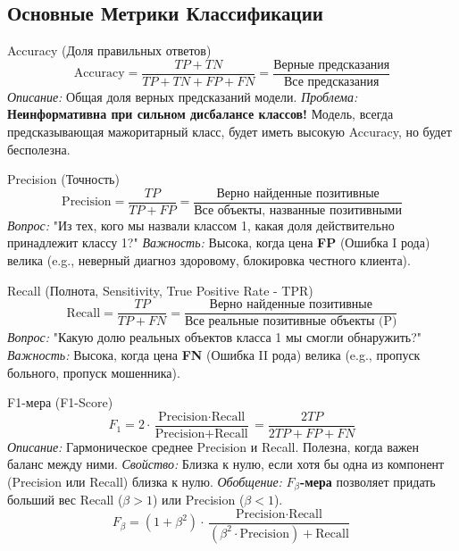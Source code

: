 \subsection{Основные Метрики Классификации}

\begin{textbox}{{Accuracy (Доля правильных ответов)}}
    \[ \text{Accuracy} = \frac{TP + TN}{TP + TN + FP + FN} = \frac{\text{Верные предсказания}}{\text{Все предсказания}} \]
    \textit{Описание:} Общая доля верных предсказаний модели.
    \textit{Проблема:} \textbf{Неинформативна при сильном дисбалансе классов!} Модель, всегда предсказывающая мажоритарный класс, будет иметь высокую Accuracy, но будет бесполезна.
\end{textbox}

\begin{textbox}{{Precision (Точность)}}
    \[ \text{Precision} = \frac{TP}{TP + FP} = \frac{\text{Верно найденные позитивные}}{\text{Все объекты, названные позитивными}} \]
    \textit{Вопрос:} "Из тех, кого мы назвали классом 1, какая доля действительно принадлежит классу 1?"
    \textit{Важность:} Высока, когда цена \textbf{FP} (Ошибка I рода) велика (e.g., неверный диагноз здоровому, блокировка честного клиента).
\end{textbox}

\begin{textbox}{{Recall (Полнота, Sensitivity, True Positive Rate - TPR)}}
    \[ \text{Recall} = \frac{TP}{TP + FN} = \frac{\text{Верно найденные позитивные}}{\text{Все реальные позитивные объекты (P)}} \]
    \textit{Вопрос:} "Какую долю реальных объектов класса 1 мы смогли обнаружить?"
    \textit{Важность:} Высока, когда цена \textbf{FN} (Ошибка II рода) велика (e.g., пропуск больного, пропуск мошенника).
\end{textbox}

\begin{textbox}{{F1-мера (F1-Score)}}
    \[ F_1 = 2 \cdot \frac{\text{Precision} \cdot \text{Recall}}{\text{Precision} + \text{Recall}} = \frac{2TP}{2TP + FP + FN} \]
    \textit{Описание:} Гармоническое среднее Precision и Recall. Полезна, когда важен баланс между ними.
    \textit{Свойство:} Близка к нулю, если хотя бы одна из компонент (Precision или Recall) близка к нулю.
    \textit{Обобщение:} \textbf{$F_\beta$-мера} позволяет придать больший вес Recall ($\beta > 1$) или Precision ($\beta < 1$).
    \[ F_\beta = (1 + \beta^2) \cdot \frac{\text{Precision} \cdot \text{Recall}}{(\beta^2 \cdot \text{Precision}) + \text{Recall}} \]
\end{textbox}

